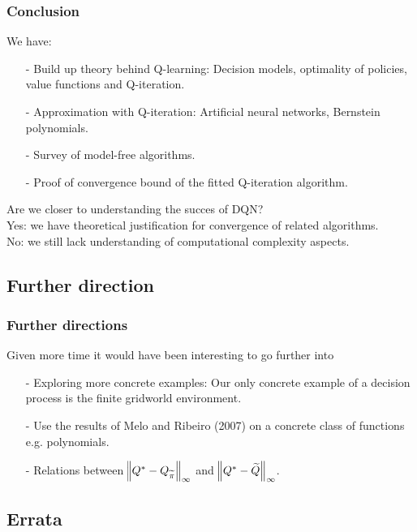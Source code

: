 \documentclass{beamer}[10]
\begin{document}
\begin{frame}
  \frametitle{Conclusion}
  \begingroup \footnotesize
  We have:
  \begin{itemize}
    \item[-] Build up theory behind Q-learning: Decision models, optimality
      of policies, value functions and Q-iteration.
    \item[-] Approximation with Q-iteration: Artificial neural networks,
      Bernstein polynomials.
    \item[-] Survey of model-free algorithms.
    \item[-] Proof of convergence bound of the fitted Q-iteration algorithm.
  \end{itemize}
  Are we closer to understanding the succes of DQN?
  \\ Yes: we have theoretical justification for convergence of related algorithms.
  \\ No: we still lack understanding of computational complexity aspects.
  \endgroup
\end{frame}

\subsection{Further direction}

\begin{frame}
  \frametitle{Further directions}
  \begingroup \footnotesize
  Given more time it would have been interesting to go further into
  \begin{itemize}
    \item[-] Exploring more concrete examples:
      Our only concrete example of a decision process is the finite gridworld
      environment.
    \item[-] Use the results of Melo and Ribeiro (2007)
      on a concrete class of functions e.g. 
      polynomials. 
    \item[-] Relations
      between $\norm{Q^* - Q_{\widetilde{\pi}}}_\infty$ and $\norm{Q^* - \widetilde{Q}}_\infty$.
  \end{itemize}
  \endgroup
\end{frame}


\subsection{Errata}
\end{document}
